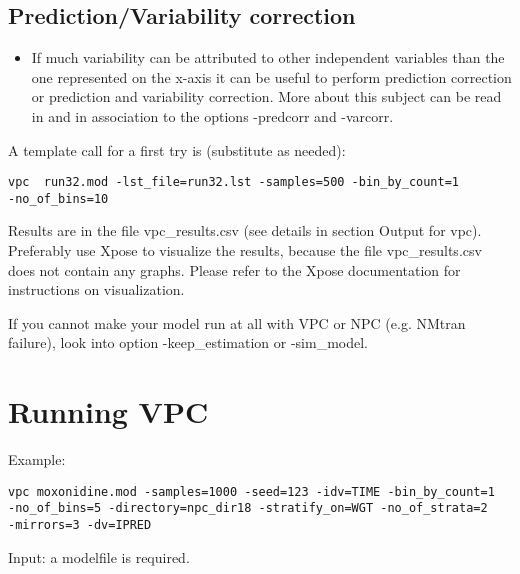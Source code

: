\subsection{Prediction/Variability correction}

\begin{itemize}
	\item If much variability can be attributed to other independent variables than the one represented on the x-axis it can be useful to perform prediction correction or prediction and variability correction. More about this subject can be read in \cite{Bergstrand} and in association to the options -predcorr and -varcorr.
\end{itemize}

A template call for a  first try is (substitute as needed):
\begin{verbatim}
vpc  run32.mod -lst_file=run32.lst -samples=500 -bin_by_count=1
-no_of_bins=10
\end{verbatim}
Results are in the file vpc\_results.csv (see details in section Output for vpc). Preferably use Xpose to visualize the results, because the file vpc\_results.csv does not contain any graphs. Please refer to the Xpose documentation for instructions on visualization.

If you cannot make your model run at all with VPC or NPC (e.g. NMtran failure), look into option -keep\_estimation or -sim\_model. 

\section{Running VPC}
Example:

\begin{verbatim}
vpc moxonidine.mod -samples=1000 -seed=123 -idv=TIME -bin_by_count=1
-no_of_bins=5 -directory=npc_dir18 -stratify_on=WGT -no_of_strata=2
-mirrors=3 -dv=IPRED
\end{verbatim}

Input:  a modelfile is required.

